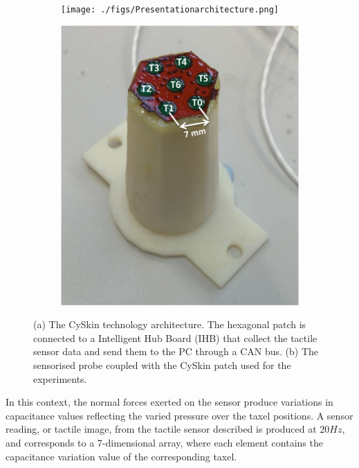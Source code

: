 \documentclass[]{interact}
\theoremstyle{plain}%
\theoremstyle{definition}
\theoremstyle{remark}
\begin{document}
\begin{figure}[] 
	\centering
	\hspace{0.0005\textwidth}
	\begin{subfigure}[b]{.54\textwidth}
		\texttt{[image: ./figs/Presentationarchitecture.png]}
		\caption{}
		\label{CySkin:schema}
	\end{subfigure} 
	\hspace{0.02\textwidth}
	\begin{subfigure}[b]{0.22\textwidth}
		\includegraphics[width=\textwidth]{./figs/probefreccia.pdf}
		\caption{}
		\label{CySkin:probe}
	\end{subfigure}
	\caption{(a) The CySkin technology architecture. The hexagonal patch is connected to a 
		Intelligent Hub Board (IHB) that collect the tactile sensor data and send them to the 
		PC through a CAN bus. (b) The sensorised probe coupled with the CySkin patch used for 
		the experiments. }
	\label{CySkin}
\end{figure}


In this context, the normal forces exerted on the sensor produce variations in capacitance 
values reflecting the varied pressure over the taxel positions. A sensor reading, or tactile 
image, from the tactile sensor described is produced at $20Hz$, and corresponds to 
a 7-dimensional array, where each element contains the capacitance variation value of 
the corresponding taxel.
\end{document}

